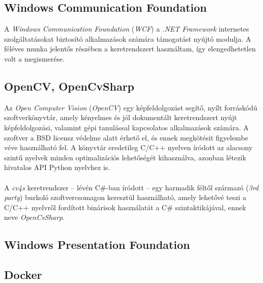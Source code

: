 \subsection{Windows Communication Foundation}
A \emph{Windows Communication Foundation} (\emph{WCF}) a \textit{.NET Framework} internetes szolgáltatásokat biztosító alkalmazások számára támogatást nyújtó modulja. A féléves munka jelentős részében a keretrendszert használtam, így elengedhetetlen volt a megismerése.

\subsection{OpenCV, OpenCvSharp}

Az \emph{Open Computer Vision} (\emph{OpenCV}) egy képfeldolgozást segítő, nyílt forráskódú szoftverkönyvtár, amely kényelmes és jól dokumentált keretrendszert nyújt képfeldolgozási, valamint gépi tanulással kapcsolatos alkalmazások számára. A szoftver a BSD licensz védelme alatt érhető el, és ennek megkötésit figyelembe véve használható fel. A könyvtár eredetileg C/C++ nyelven íródott az alacsony szintű nyelvek minden optimalizációs lehetőségét kihasználva, azonban létezik hivatalos API Python nyelvhez is. \\
\\
A \emph{cv4s} keretrendszer -- lévén C\#-ban íródott -- egy harmadik féltől származó (\textit{3rd party}) burkoló szoftvercsomagon keresztül használható, amely lehetővé teszi a C/C++ nyelvről fordított binárisok használatát a C\# szintaktikájával, ennek neve \emph{OpenCvSharp}.

\subsection{Windows Presentation Foundation}

\subsection{Docker}
